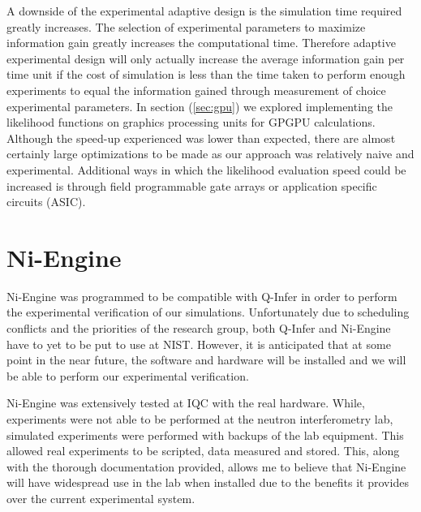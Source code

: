 A downside of the experimental adaptive design is the simulation time required greatly increases. The selection of experimental parameters to maximize information gain greatly increases the computational time. Therefore adaptive experimental design will only actually increase the average information gain per time unit if the cost of simulation is less than the time taken to perform enough experiments to equal the information gained through measurement of choice experimental parameters. In section (\ref{sec:gpu}) we explored implementing the likelihood functions on graphics processing units for GPGPU calculations. Although the speed-up experienced was lower than expected, there are almost certainly large optimizations to be made as our approach was relatively naive and experimental. Additional ways in which the likelihood evaluation speed could be increased is through field programmable gate arrays or application specific circuits (ASIC). 

\section{Ni-Engine}
Ni-Engine was programmed to be compatible with Q-Infer in order to perform the experimental verification of our simulations. Unfortunately due to scheduling conflicts and the priorities of the research group, both Q-Infer and Ni-Engine have to yet to be put to use at NIST. However, it is anticipated that at some point in the near future, the software and hardware will be installed and we will be able to perform our experimental verification. 

Ni-Engine was extensively tested at IQC with the real hardware. While, experiments were not able to be performed at the neutron interferometry lab, simulated experiments were performed with backups of the lab equipment. This allowed real experiments to be scripted, data measured and stored. This, along with the thorough documentation provided, allows me to believe that Ni-Engine will have widespread use in the lab when installed due to the benefits it provides over the current experimental system. 

